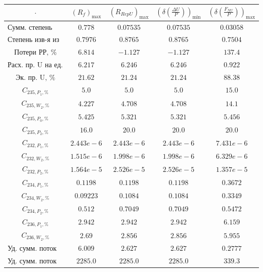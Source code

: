 \begin{table}
    \begin{tabular}{ccccc}
        $\cdot$ & $(R_f)_\text{max}$ & $(R_{RepU})_\text{max}$ & $(\delta(\frac{\Delta U}{P}))_\text{min}$ & $(\delta(\frac{F_{NU}}{P}))_\text{max}$\\ \hline
        $\text{Сумм. степень изв-я}$ & $0.778$ & $0.07535$ & $0.07535$ & $0.03058$\\ \hline
        $\text{Степень изв-я из рег-та}$ & $0.7976$ & $0.8765$ & $0.8765$ & $0.7504$\\ \hline
        $\text{Потери РР, \%}$ & $6.814$ & $-1.127$ & $-1.127$ & $137.4$\\ \hline
        $\text{Расх. пр. U на ед. прод.}$ & $6.217$ & $6.246$ & $6.246$ & $0.922$\\ \hline
        $\text{Эк. пр. U, \%}$ & $21.62$ & $21.24$ & $21.24$ & $88.38$\\ \hline
        $C_{235,P_1, \%}$ & $5.0$ & $5.0$ & $5.0$ & $15.0$\\ \hline
        $C_{235,W_2, \%}$ & $4.227$ & $4.708$ & $4.708$ & $14.1$\\ \hline
        $C_{235,P_0, \%}$ & $5.425$ & $5.321$ & $5.321$ & $5.456$\\ \hline
        $C_{235,P_2, \%}$ & $16.0$ & $20.0$ & $20.0$ & $20.0$\\ \hline
        $C_{232,P_1, \%}$ & $2.443e-6$ & $2.443e-6$ & $2.443e-6$ & $7.431e-6$\\ \hline
        $C_{232,W_2, \%}$ & $1.515e-6$ & $1.998e-6$ & $1.998e-6$ & $6.329e-6$\\ \hline
        $C_{232,P_2, \%}$ & $1.564e-5$ & $2.526e-5$ & $2.526e-5$ & $1.357e-5$\\ \hline
        $C_{234,P_1, \%}$ & $0.1198$ & $0.1198$ & $0.1198$ & $0.3672$\\ \hline
        $C_{234,W_2, \%}$ & $0.09223$ & $0.1084$ & $0.1084$ & $0.3349$\\ \hline
        $C_{234,P_2, \%}$ & $0.512$ & $0.7049$ & $0.7049$ & $0.5472$\\ \hline
        $C_{236,P_1, \%}$ & $2.942$ & $2.942$ & $2.942$ & $6.159$\\ \hline
        $C_{236,W_2, \%}$ & $2.69$ & $2.856$ & $2.856$ & $5.955$\\ \hline
        $\text{Уд. сумм. поток к-а 2}$ & $6.009$ & $2.627$ & $2.627$ & $0.2777$\\ \hline
        $\text{Уд. сумм. поток доп. к-а}$ & $2285.0$ & $2285.0$ & $2285.0$ & $339.3$\\ \hline

\end{tabular}
\end{table}
